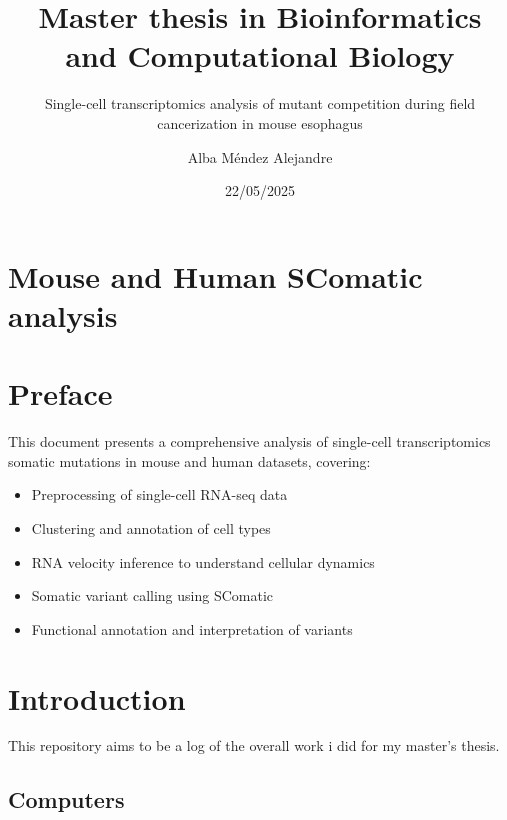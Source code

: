 \documentclass[
  letterpaper,
  DIV=11,
  numbers=noendperiod]{scrreprt}
\title{Master thesis in Bioinformatics and Computational Biology}
\subtitle{Single-cell transcriptomics analysis of mutant competition
during field cancerization in mouse esophagus}
\author{Alba Méndez Alejandre}
\date{22/05/2025}
\providecommand{\tightlist}{%
  \setlength{\itemsep}{0pt}\setlength{\parskip}{0pt}}\usepackage{longtable,booktabs,array}
\renewcommand*\contentsname{Table of contents}
\newcommand\contentsname{Table of contents}
\begin{document}
\maketitle

\renewcommand*\contentsname{Table of contents}
{
\hypersetup{linkcolor=}
\setcounter{tocdepth}{2}
\tableofcontents
}


\chapter{Mouse and Human SComatic
analysis}\label{mouse-and-human-scomatic-analysis}


\chapter*{Preface}\label{preface}


This document presents a comprehensive analysis of single-cell
transcriptomics somatic mutations in mouse and human datasets, covering:

\begin{itemize}
\tightlist
\item
  Preprocessing of single-cell RNA-seq data
\item
  Clustering and annotation of cell types
\item
  RNA velocity inference to understand cellular dynamics
\item
  Somatic variant calling using SComatic
\item
  Functional annotation and interpretation of variants
\end{itemize}


\chapter{Introduction}\label{introduction}

This repository aims to be a log of the overall work i did for my
master's thesis.

\section{Computers}\label{computers}
\end{document}
